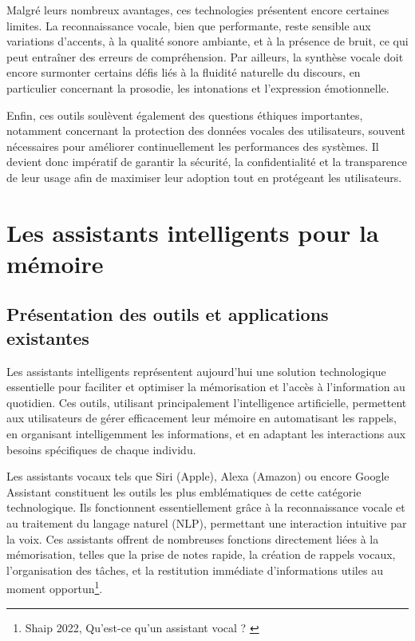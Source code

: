\documentclass[11pt,a4paper]{report}
\begin{document}
Malgré leurs nombreux avantages, ces technologies présentent encore certaines limites. La reconnaissance vocale, bien que performante, reste sensible aux variations d’accents, à la qualité sonore ambiante, et à la présence de bruit, ce qui peut entraîner des erreurs de compréhension. Par ailleurs, la synthèse vocale doit encore surmonter certains défis liés à la fluidité naturelle du discours, en particulier concernant la prosodie, les intonations et l’expression émotionnelle.

Enfin, ces outils soulèvent également des questions éthiques importantes, notamment concernant la protection des données vocales des utilisateurs, souvent nécessaires pour améliorer continuellement les performances des systèmes. Il devient donc impératif de garantir la sécurité, la confidentialité et la transparence de leur usage afin de maximiser leur adoption tout en protégeant les utilisateurs.

\section{Les assistants intelligents pour la mémoire}

\subsection{Présentation des outils et applications existantes}

Les assistants intelligents représentent aujourd’hui une solution technologique essentielle pour faciliter et optimiser la mémorisation et l'accès à l’information au quotidien. Ces outils, utilisant principalement l’intelligence artificielle, permettent aux utilisateurs de gérer efficacement leur mémoire en automatisant les rappels, en organisant intelligemment les informations, et en adaptant les interactions aux besoins spécifiques de chaque individu.

Les assistants vocaux tels que Siri (Apple), Alexa (Amazon) ou encore Google Assistant constituent les outils les plus emblématiques de cette catégorie technologique. Ils fonctionnent essentiellement grâce à la reconnaissance vocale et au traitement du langage naturel (NLP), permettant une interaction intuitive par la voix. Ces assistants offrent de nombreuses fonctions directement liées à la mémorisation, telles que la prise de notes rapide, la création de rappels vocaux, l’organisation des tâches, et la restitution immédiate d'informations utiles au moment opportun\footnote{Shaip 2022, Qu'est-ce qu'un assistant vocal ? \cite{shaip}}.
\end{document}
